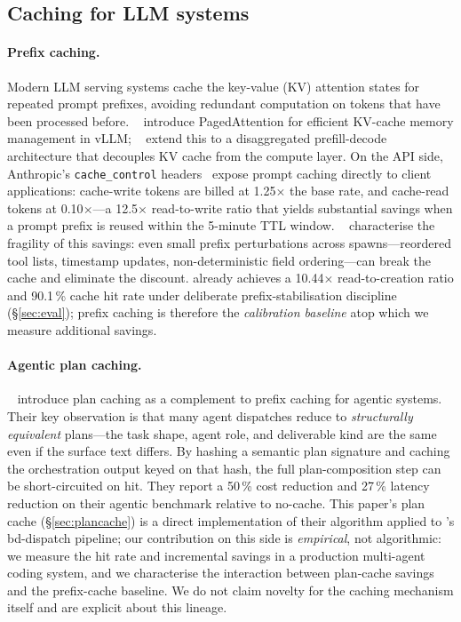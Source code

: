\subsection{Caching for LLM systems}
\label{sec:related-caching}

\paragraph{Prefix caching.}
Modern LLM serving systems cache the key-value (KV) attention
states for repeated prompt prefixes, avoiding redundant
computation on tokens that have been processed before.
\citeauthor{pagedattention}~\cite{pagedattention} introduce
PagedAttention for efficient KV-cache memory management in vLLM;
\citeauthor{mooncake}~\cite{mooncake} extend this to a
disaggregated prefill-decode architecture that decouples KV
cache from the compute layer. On the API side, Anthropic's
\texttt{cache\_control} headers~\cite{anthropic-cache} expose
prompt caching directly to client applications: cache-write
tokens are billed at 1.25\(\times\) the base rate, and cache-read
tokens at 0.10\(\times\)---a 12.5\(\times\) read-to-write ratio
that yields substantial savings when a prompt prefix is reused
within the 5-minute TTL window. \citeauthor{dont-break-cache}~\cite{dont-break-cache}
characterise the fragility of this savings: even small prefix
perturbations across spawns---reordered tool lists, timestamp
updates, non-deterministic field ordering---can break the cache
and eliminate the discount. \blackrim already achieves a
10.44\(\times\) read-to-creation ratio and 90.1\,\% cache hit rate
under deliberate prefix-stabilisation discipline (\S\ref{sec:eval});
prefix caching is therefore the \emph{calibration baseline} atop
which we measure additional savings.

\paragraph{Agentic plan caching.}
\citeauthor{plancache}~\cite{plancache} introduce plan caching as
a complement to prefix caching for agentic systems. Their key
observation is that many agent dispatches reduce to
\emph{structurally equivalent} plans---the task shape, agent role,
and deliverable kind are the same even if the surface text differs.
By hashing a semantic plan signature and caching the orchestration
output keyed on that hash, the full plan-composition step can be
short-circuited on hit. They report a 50\,\% cost reduction and
27\,\% latency reduction on their agentic benchmark relative to
no-cache. This paper's plan cache (\S\ref{sec:plancache}) is a
direct implementation of their algorithm applied to \blackrim's
bd-dispatch pipeline; our contribution on this side is
\emph{empirical}, not algorithmic: we measure the hit rate and
incremental savings in a production multi-agent coding system,
and we characterise the interaction between plan-cache savings and
the prefix-cache baseline. We do not claim novelty for the
caching mechanism itself and are explicit about this lineage.

